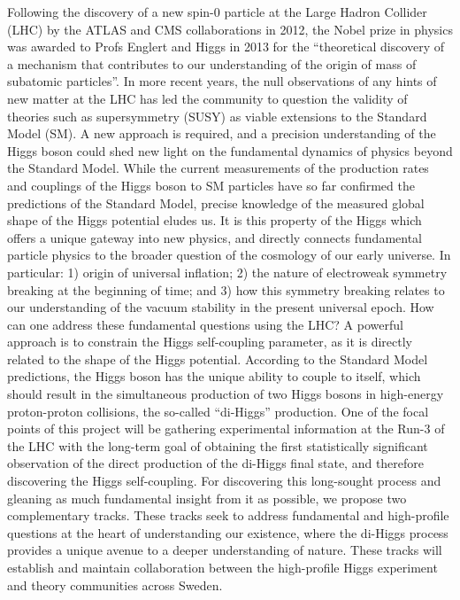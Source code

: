 \documentclass[10pt,oneside,notitlepage,abstracton,a4paper]{scrartcl}
\begin{document}
Following the discovery of a new spin-0 particle at the Large Hadron Collider (LHC) by the ATLAS and CMS collaborations in 2012, the Nobel prize in physics was awarded to Profs Englert and Higgs in 2013 for the ``theoretical discovery of a mechanism that contributes to our understanding of the origin of mass of subatomic particles”. In more recent years, the null observations of any hints of new matter at the LHC has led the community to question the validity of theories such as supersymmetry (SUSY) as viable extensions to the Standard Model (SM). A new approach is required, and a precision understanding of the Higgs boson could shed new light on the fundamental dynamics of physics beyond the Standard Model. While the current measurements of the production rates and couplings of the Higgs boson to SM particles have so far confirmed the predictions of the Standard Model, precise knowledge of the measured global shape of the Higgs potential eludes us. It is this property of the Higgs which offers a unique gateway into new physics, and directly connects fundamental particle physics to the broader question of the cosmology of our early universe. In particular: 1) origin of universal inflation; 2) the nature of electroweak symmetry breaking at the beginning of time; and 3) how this symmetry breaking relates to our understanding of the vacuum stability in the present universal epoch. How can one address these fundamental questions using the LHC? A powerful approach is to constrain the Higgs self-coupling parameter, as it is directly related to the shape of the Higgs potential. According to the Standard Model predictions, the Higgs boson has the unique ability to couple to itself, which should result in the simultaneous production of two Higgs bosons in high-energy proton-proton collisions, the so-called ``di-Higgs” production. One of the focal points of this project will be gathering experimental information at the Run-3 of the LHC with the long-term goal of obtaining the first statistically significant observation of the direct production of the di-Higgs final state, and therefore discovering the Higgs self-coupling. For discovering this long-sought process and gleaning as much fundamental insight from it as possible, we propose two complementary tracks. These tracks seek to address fundamental and high-profile questions at the heart of understanding our existence, where the di-Higgs process provides a unique avenue to a deeper understanding of nature. These tracks will establish and maintain collaboration between the high-profile Higgs experiment and theory communities across Sweden. \\
\end{document}
